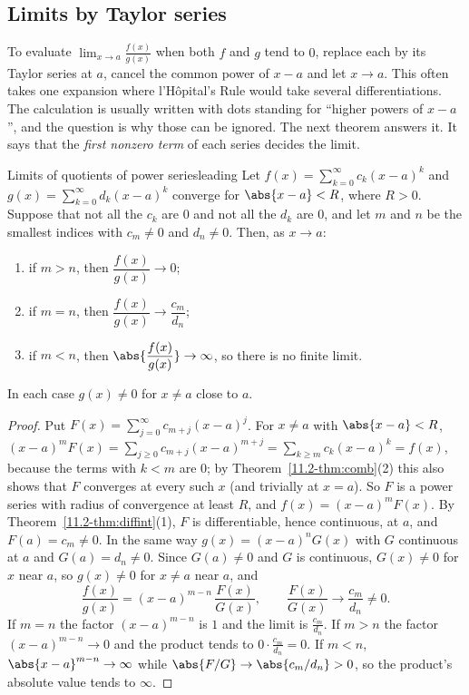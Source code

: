 \documentclass[11pt]{article}
\begin{document}
\subsection*{Limits by Taylor series}

To evaluate $\lim_{x\to a}\frac{f(x)}{g(x)}$ when both $f$ and $g$ tend to $0$, replace each by its Taylor series at $a$, cancel the common power of $x-a$ and let $x\to a$. This often takes one expansion where l'H\^opital's Rule would take several differentiations. The calculation is usually written with dots standing for ``higher powers of $x-a$'', and the question is why those can be ignored. The next theorem answers it. It says that the \emph{first nonzero term} of each series decides the limit.

\begin{thm}{Limits of quotients of power series}{leading}
Let $f(x)=\sum_{k=0}^\infty c_k(x-a)^k$ and $g(x)=\sum_{k=0}^\infty d_k(x-a)^k$ converge for $\abs{x-a}<R$, where $R>0$. Suppose that not all the $c_k$ are $0$ and not all the $d_k$ are $0$, and let $m$ and $n$ be the smallest indices with $c_m\ne0$ and $d_n\ne0$. Then, as $x\to a$:
\begin{enumerate}
  \item if $m>n$, then $\dfrac{f(x)}{g(x)}\to0$;
  \item if $m=n$, then $\dfrac{f(x)}{g(x)}\to\dfrac{c_m}{d_n}$;
  \item if $m<n$, then $\abs{\dfrac{f(x)}{g(x)}}\to\infty$, so there is no finite limit.
\end{enumerate}
In each case $g(x)\ne0$ for $x\ne a$ close to $a$.
\end{thm}
\begin{proof}
Put $F(x)=\sum_{j=0}^\infty c_{m+j}(x-a)^j$. For $x\ne a$ with $\abs{x-a}<R$, $(x-a)^mF(x)=\sum_{j\ge0}c_{m+j}(x-a)^{m+j}=\sum_{k\ge m}c_k(x-a)^k=f(x)$, because the terms with $k<m$ are $0$; by Theorem~\ref{11.2-thm:comb}(2) this also shows that $F$ converges at every such $x$ (and trivially at $x=a$). So $F$ is a power series with radius of convergence at least $R$, and $f(x)=(x-a)^mF(x)$. By Theorem~\ref{11.2-thm:diffint}(1), $F$ is differentiable, hence continuous, at $a$, and $F(a)=c_m\ne0$. In the same way $g(x)=(x-a)^nG(x)$ with $G$ continuous at $a$ and $G(a)=d_n\ne0$. Since $G(a)\ne0$ and $G$ is continuous, $G(x)\ne0$ for $x$ near $a$, so $g(x)\ne0$ for $x\ne a$ near $a$, and
\[
\frac{f(x)}{g(x)}=(x-a)^{m-n}\,\frac{F(x)}{G(x)},\qquad\frac{F(x)}{G(x)}\to\frac{c_m}{d_n}\ne0 .
\]
If $m=n$ the factor $(x-a)^{m-n}$ is $1$ and the limit is $\frac{c_m}{d_n}$. If $m>n$ the factor $(x-a)^{m-n}\to0$ and the product tends to $0\cdot\frac{c_m}{d_n}=0$. If $m<n$, $\abs{x-a}^{m-n}\to\infty$ while $\abs{F/G}\to\abs{c_m/d_n}>0$, so the product's absolute value tends to $\infty$.
\end{proof}
\end{document}
